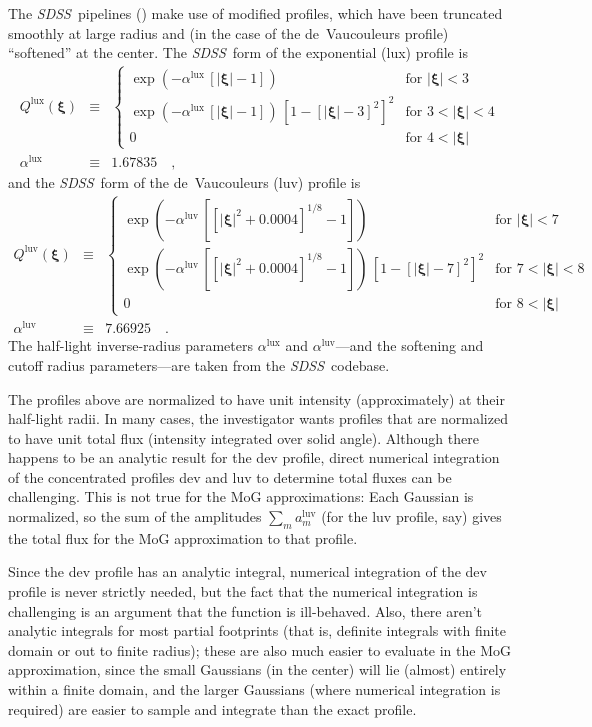\documentclass[12pt,pdftex,preprint]{aastex}
\newcommand{\project}[1]{\textsl{#1}}
\newcommand{\sdss}{\project{SDSS}}
\newcommand{\tvector}[1]{\boldsymbol{#1}}
\newcommand{\spos}{\tvector{\xi}}
\newcommand{\lux}{\mathrm{lux}}
\newcommand{\luv}{\mathrm{luv}}
\begin{document}
The \sdss\ pipelines (\citealt{lupton}) make use of modified profiles,
which have been truncated smoothly at large radius and (in the case of
the de~Vaucouleurs profile) ``softened'' at the center.  The
\sdss\ form of the exponential (lux) profile is
\begin{eqnarray}\displaystyle
Q^{\lux}(\spos) &\equiv& \left\{\begin{array}{ll}
  \exp(-\alpha^{\lux}\,[|\spos| - 1]) & \mbox{for~}|\spos| < 3 \\
  \exp(-\alpha^{\lux}\,[|\spos| - 1])
  \,\left[1 - [|\spos| - 3]^2\right]^2 & \mbox{for~}3 < |\spos| < 4 \\
  0                                   & \mbox{for~}4 < |\spos|
\end{array}\right.
\\
\alpha^{\lux} &\equiv& 1.67835
\quad ,
\end{eqnarray}
and the \sdss\ form of the de~Vaucouleurs (luv) profile is
\begin{eqnarray}\displaystyle
Q^{\luv}(\spos) &\equiv& \left\{\begin{array}{ll}
  \exp(-\alpha^{\luv}\,\left[[|\spos|^2 + 0.0004]^{1/8} - 1\right]) & \mbox{for~}|\spos| < 7 \\
  \exp(-\alpha^{\luv}\,\left[[|\spos|^2 + 0.0004]^{1/8} - 1\right])
  \,\left[1 - [|\spos| - 7]^2\right]^2 & \mbox{for~}7 < |\spos| < 8 \\
  0                                   & \mbox{for~}8 < |\spos|
\end{array}\right.
\\
\alpha^{\luv} &\equiv& 7.66925
\quad .
\end{eqnarray}
The half-light inverse-radius parameters $\alpha^{\lux}$ and
$\alpha^{\luv}$---and the softening and cutoff radius parameters---are
taken from the \sdss\ codebase.

The profiles above are normalized to have unit intensity
(approximately) at their half-light radii.  In many cases, the
investigator wants profiles that are normalized to have unit total
flux (intensity integrated over solid angle).  Although there happens
to be an analytic result for the dev profile, direct numerical
integration of the concentrated profiles dev and luv to determine
total fluxes can be challenging.  This is not true for the MoG
approximations: Each Gaussian is normalized, so the sum of the
amplitudes $\sum_m a^{\luv}_m$ (for the luv profile, say) gives the
total flux for the MoG approximation to that profile.

Since the dev profile has an analytic integral, numerical integration
of the dev profile is never strictly needed, but the fact that the
numerical integration is challenging is an argument that the function
is ill-behaved.  Also, there aren't analytic integrals for most
partial footprints (that is, definite integrals with finite domain or
out to finite radius); these are also much easier to evaluate in the
MoG approximation, since the small Gaussians (in the center) will lie
(almost) entirely within a finite domain, and the larger Gaussians
(where numerical integration is required) are easier to sample and
integrate than the exact profile.
\end{document}
